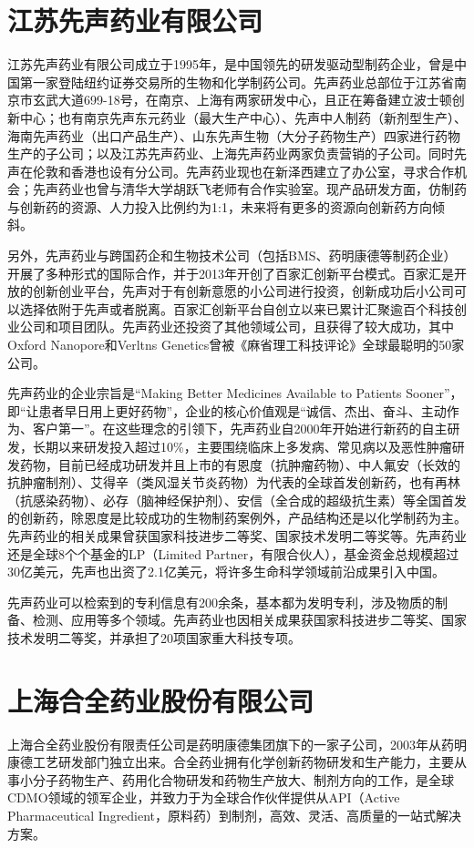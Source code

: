 \documentclass[twocolumn,openany]{ctexbook}
\begin{document}
		\section{江苏先声药业有限公司}
		
		江苏先声药业有限公司成立于1995年，是中国领先的研发驱动型制药企业，曾是中国第一家登陆纽约证券交易所的生物和化学制药公司。先声药业总部位于江苏省南京市玄武大道699-18号，在南京、上海有两家研发中心，且正在筹备建立波士顿创新中心；也有南京先声东元药业（最大生产中心）、先声中人制药（新剂型生产）、海南先声药业（出口产品生产）、山东先声生物（大分子药物生产）四家进行药物生产的子公司；以及江苏先声药业、上海先声药业两家负责营销的子公司。同时先声在伦敦和香港也设有分公司。先声药业现也在新泽西建立了办公室，寻求合作机会；先声药业也曾与清华大学胡跃飞老师有合作实验室。现产品研发方面，仿制药与创新药的资源、人力投入比例约为1:1，未来将有更多的资源向创新药方向倾斜\citep{RN34}。
		
		另外，先声药业与跨国药企和生物技术公司（包括BMS、药明康德等制药企业）开展了多种形式的国际合作，并于2013年开创了百家汇创新平台模式。百家汇是开放的创新创业平台，先声对于有创新意愿的小公司进行投资，创新成功后小公司可以选择依附于先声或者脱离。百家汇创新平台自创立以来已累计汇聚逾百个科技创业公司和项目团队。先声药业还投资了其他领域公司，且获得了较大成功，其中Oxford Nanopore和Verltns Genetics曾被《麻省理工科技评论》全球最聪明的50家公司。
		
		先声药业的企业宗旨是“Making Better Medicines Available to Patients Sooner”，即“让患者早日用上更好药物”，企业的核心价值观是“诚信、杰出、奋斗、主动作为、客户第一”。在这些理念的引领下，先声药业自2000年开始进行新药的自主研发，长期以来研发投入超过10\%，主要围绕临床上多发病、常见病以及恶性肿瘤研发药物，目前已经成功研发并且上市的有恩度（抗肿瘤药物）、中人氟安（长效的抗肿瘤制剂）、艾得辛（类风湿关节炎药物）为代表的全球首发创新药，也有再林（抗感染药物）、必存（脑神经保护剂）、安信（全合成的超级抗生素）等全国首发的创新药，除恩度是比较成功的生物制药案例外，产品结构还是以化学制药为主\citep{RN35}。先声药业的相关成果曾获国家科技进步二等奖、国家技术发明二等奖等。先声药业还是全球8个个基金的LP（Limited Partner，有限合伙人），基金资金总规模超过30亿美元，先声也出资了2.1亿美元，将许多生命科学领域前沿成果引入中国。
		
		
		先声药业可以检索到的专利信息有200余条，基本都为发明专利，涉及物质的制备、检测、应用等多个领域。先声药业也因相关成果获国家科技进步二等奖、国家技术发明二等奖，并承担了20项国家重大科技专项。
	
		\section{上海合全药业股份有限公司}
	上海合全药业股份有限责任公司是药明康德集团旗下的一家子公司，2003年从药明康德工艺研发部门独立出来。合全药业拥有化学创新药物研发和生产能力，主要从事小分子药物生产、药用化合物研发和药物生产放大、制剂方向的工作，是全球CDMO领域的领军企业，并致力于为全球合作伙伴提供从API（Active Pharmaceutical Ingredient，原料药）到制剂，高效、灵活、高质量的一站式解决方案。
	
\end{document}
